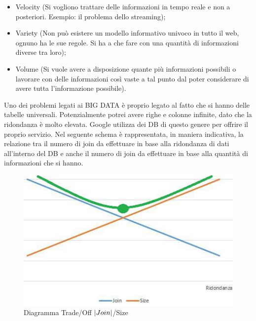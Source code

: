 \begin{itemize}

\item Velocity (Si vogliono trattare delle informazioni in tempo reale e non a posteriori. Esempio: il problema dello streaming);
\item Variety (Non può esistere un modello informativo univoco in tutto il web, ognuno ha le sue regole. Si ha a che fare con una quantità di informazioni diverse tra loro);
\item Volume (Si vuole avere a disposizione quante più informazioni possibili o lavorare con delle informazioni così vaste a tal punto dal poter considerare di avere tutta l’informazione possibile). 

\end{itemize}

Uno dei problemi legati ai BIG DATA è proprio legato al fatto che si hanno delle tabelle universali. Potenzialmente potrei avere righe e colonne infinite, dato che la ridondanza è molto elevata. 
Google utilizza dei DB di questo genere per offrire il proprio servizio.  
Nel seguente schema è rappresentata, in maniera indicativa, la relazione tra il numero di join da effettuare in base alla ridondanza di dati all’interno del DB e anche il numero di join da effettuare in base alla quantità di informazioni che si hanno. 

\begin{center}
\begin{figure}[H]
\centering
\includegraphics[scale=1]{figures/ridondanza.png}
\caption{Diagramma Trade/Off $\left\vert{Join}\right\vert$/Size}
\end{figure}
\end{center}

